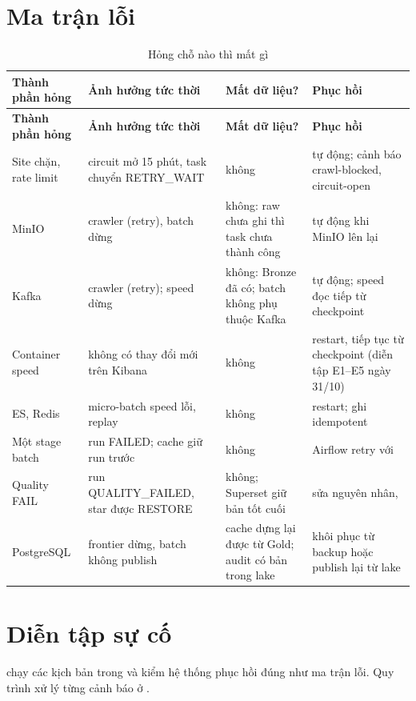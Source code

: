 \section{Ma trận lỗi}\label{sec:failure-matrix}
\begin{xltabular}{\linewidth}{@{}L{26mm}Y L{34mm}Y@{}}
  \caption{Hỏng chỗ nào thì mất gì}\label{tab:failure-matrix}\\
  \toprule
  \textbf{Thành phần hỏng} & \textbf{Ảnh hưởng tức thời} & \textbf{Mất dữ liệu?} & \textbf{Phục hồi} \\
  \midrule
  \endfirsthead
  \toprule \textbf{Thành phần hỏng} & \textbf{Ảnh hưởng tức thời} & \textbf{Mất dữ liệu?} & \textbf{Phục hồi} \\ \midrule
  \endhead
  Site chặn, rate limit & circuit mở 15 phút, task chuyển RETRY\_WAIT & không & tự động; cảnh báo crawl-blocked, circuit-open \\
  MinIO & crawler  (retry), batch dừng & không: raw chưa ghi thì task chưa thành công & tự động khi MinIO lên lại \\
  Kafka & crawler  (retry); speed dừng & không: Bronze đã có; batch không phụ thuộc Kafka & tự động; speed đọc tiếp từ checkpoint \\
  Container speed & không có thay đổi mới trên Kibana & không & restart, tiếp tục từ checkpoint (diễn tập E1--E5 ngày 31/10) \\
  ES, Redis & micro-batch speed lỗi, replay & không & restart; ghi idempotent \\
  Một stage batch & run FAILED; cache giữ run trước & không & Airflow retry với  \\
  Quality FAIL & run QUALITY\_FAILED, star được RESTORE & không; Superset giữ bản tốt cuối & sửa nguyên nhân,  \\
  PostgreSQL & frontier dừng, batch không publish & cache dựng lại được từ Gold; audit có bản trong lake & khôi phục từ backup hoặc publish lại từ lake \\
  \bottomrule
\end{xltabular}

\section{Diễn tập sự cố}
 chạy các kịch bản trong  và kiểm hệ thống phục hồi đúng như ma trận lỗi.
Quy trình xử lý từng cảnh báo ở .

